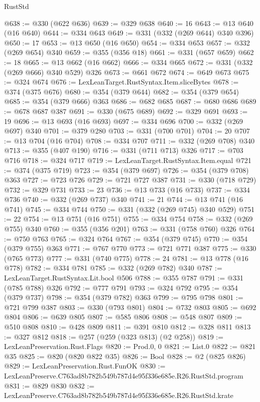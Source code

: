\begin{lexlean}{RustStd}
\begin{coremodule}
@638 := @330 (@622 @636)
@639 := @329 @638
@640 := 16
@643 := @13 @640 (@16 @640)
@644 := @334 @643
@649 := @331 (@332 (@269 @644) @340 @396)
@650 := 17
@653 := @13 @650 (@16 @650)
@654 := @334 @653
@657 := @332 (@269 @654) @340
@659 := @355 (@356 @18)
@661 := @331 (@657 @659)
@662 := 18
@665 := @13 @662 (@16 @662)
@666 := @334 @665
@672 := @331 (@332 (@269 @666) @340 @529) @326
@673 := @661 @672
@674 := @649 @673
@675 := @324 @674
@676 := LexLeanTarget.RustSyntax.Item.sliceBytes
@678 := @374 (@375 @676)
@680 := @354 (@379 @644)
@682 := @354 (@379 @654)
@685 := @354 (@379 @666) @363
@686 := @682 @685
@687 := @680 @686
@689 := @678 @687 @387
@691 := @330 (@675 @689)
@692 := @329 @691
@693 := 19
@696 := @13 @693 (@16 @693)
@697 := @334 @696
@700 := @332 (@269 @697) @340
@701 := @379 @280
@703 := @331 (@700 @701)
@704 := 20
@707 := @13 @704 (@16 @704)
@708 := @334 @707
@711 := @332 (@269 @708) @340
@713 := @355 (@407 @190)
@716 := @331 (@711 @713) @326
@717 := @703 @716
@718 := @324 @717
@719 := LexLeanTarget.RustSyntax.Item.equal
@721 := @374 (@375 @719)
@723 := @354 (@379 @697)
@726 := @354 (@379 @708) @363
@727 := @723 @726
@729 := @721 @727 @387
@731 := @330 (@718 @729)
@732 := @329 @731
@733 := 23
@736 := @13 @733 (@16 @733)
@737 := @334 @736
@740 := @332 (@269 @737) @340
@741 := 21
@744 := @13 @741 (@16 @741)
@745 := @334 @744
@750 := @331 (@332 (@269 @745) @340 @529)
@751 := 22
@754 := @13 @751 (@16 @751)
@755 := @334 @754
@758 := @332 (@269 @755) @340
@760 := @355 (@356 @201)
@763 := @331 (@758 @760) @326
@764 := @750 @763
@765 := @324 @764
@767 := @354 (@379 @745)
@770 := @354 (@379 @755) @363
@771 := @767 @770
@773 := @721 @771 @387
@775 := @330 (@765 @773)
@777 := @331 (@740 @775)
@778 := 24
@781 := @13 @778 (@16 @778)
@782 := @334 @781
@785 := @332 (@269 @782) @340
@787 := LexLeanTarget.RustSyntax.Lit.bool @506
@788 := @355 @787
@791 := @331 (@785 @788) @326
@792 := @777 @791
@793 := @324 @792
@795 := @354 (@379 @737)
@798 := @354 (@379 @782) @363
@799 := @795 @798
@801 := @721 @799 @387
@803 := @330 (@793 @801)
@804 := @732 @803
@805 := @692 @804
@806 := @639 @805
@807 := @585 @806
@808 := @548 @807
@809 := @510 @808
@810 := @428 @809
@811 := @391 @810
@812 := @328 @811
@813 := @327 @812
@818 := @257 (@259 (@323 @813) (@2 @258))
@819 := LexLeanPreservation.Rust.Flags
@820 := Prod.{0, 0}
@821 := List.{0}
@822 := @821 @35
@825 := @820 (@820 @822 @35)
@826 := Bool
@828 := @2 (@825 @826)
@829 := LexLeanPreservation.Rust.FunOK
@830 := LexLeanPreserve.C763ad8b782b549b787d4e95f336e685e.R26.RustStd.program
@831 := @829 @830
@832 := LexLeanPreserve.C763ad8b782b549b787d4e95f336e685e.R26.RustStd.krate

\end{coremodule}
\end{lexlean}
